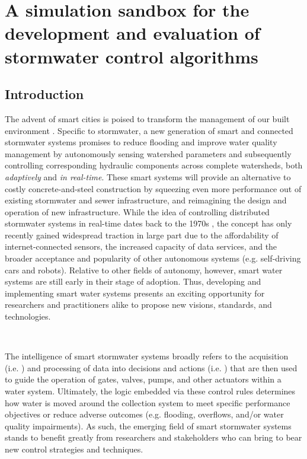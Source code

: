 \chapter[\texttt{pystorms}]{A simulation sandbox for the development and evaluation of stormwater control algorithms}\label{ch:pystorms}

\vspace{1cm}

\section{Introduction}


The advent of smart cities is poised to transform the management of our built environment \citep{Chourabi2012, Harrison2011}. Specific to stormwater, a new generation of smart and connected stormwater systems promises to reduce flooding and improve water quality management by autonomously sensing watershed parameters and subsequently controlling corresponding hydraulic components across complete watersheds, both \emph{adaptively} and \emph{in real-time}. These smart systems will provide an alternative to costly concrete-and-steel construction by squeezing even more performance out of existing stormwater and sewer infrastructure, and reimagining the design and operation of new infrastructure. While the idea of controlling distributed stormwater systems in real-time dates back to the 1970s \citep{Trotta1977}, the concept has only recently gained widespread traction in large part due to the affordability of internet-connected sensors, the increased capacity of data services, and the broader acceptance and popularity of other autonomous systems (e.g. self-driving cars and robots). Relative to other fields of autonomy, however, smart water systems are still early in their stage of adoption. Thus, developing and implementing smart water systems presents an exciting opportunity for researchers and practitioners alike to propose new visions, standards, and technologies.

 \
 
The intelligence of smart stormwater systems broadly refers to the acquisition (i.e. ) and processing of data into decisions and actions (i.e. ) that are then used to guide the operation of gates, valves, pumps, and other actuators within a water system. Ultimately, the logic embedded via these control rules determines how water is moved around the collection system to meet specific performance objectives or reduce adverse outcomes (e.g. flooding, overflows, and/or water quality impairments). As such, the emerging field of smart stormwater systems stands to benefit greatly from researchers and stakeholders who can bring to bear new control strategies and techniques.

